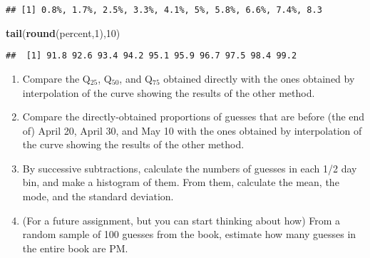 \documentclass[]{book}
\newenvironment{Shaded}{\begin{snugshade}}{\end{snugshade}}
\newcommand{\DataTypeTok}[1]{\textcolor[rgb]{0.13,0.29,0.53}{#1}}
\newcommand{\DecValTok}[1]{\textcolor[rgb]{0.00,0.00,0.81}{#1}}
\newcommand{\KeywordTok}[1]{\textcolor[rgb]{0.13,0.29,0.53}{\textbf{#1}}}
\newcommand{\NormalTok}[1]{#1}
\newcommand{\OperatorTok}[1]{\textcolor[rgb]{0.81,0.36,0.00}{\textbf{#1}}}
\newcommand{\StringTok}[1]{\textcolor[rgb]{0.31,0.60,0.02}{#1}}
\begin{document}
\begin{Shaded}
\end{Shaded}

\begin{verbatim}
## [1] 0.8%, 1.7%, 2.5%, 3.3%, 4.1%, 5%, 5.8%, 6.6%, 7.4%, 8.3
\end{verbatim}

\begin{Shaded}
\begin{Highlighting}[]
\KeywordTok{tail}\NormalTok{(}\KeywordTok{round}\NormalTok{(percent,}\DecValTok{1}\NormalTok{),}\DecValTok{10}\NormalTok{)}
\end{Highlighting}
\end{Shaded}

\begin{verbatim}
##  [1] 91.8 92.6 93.4 94.2 95.1 95.9 96.7 97.5 98.4 99.2
\end{verbatim}

\begin{enumerate}
\def\labelenumi{\arabic{enumi}.}
\setcounter{enumi}{2}
\item
  Compare the Q\(_{25}\), Q\(_{50}\), and Q\(_{75}\) obtained directly with the ones obtained by interpolation of the curve showing the results of the other method.
\item
  Compare the directly-obtained proportions of guesses that are before (the end of) April 20, April 30, and May 10 with the ones obtained by interpolation of the curve showing the results of the other method.
\item
  By successive subtractions, calculate the numbers of guesses in each 1/2 day bin, and make a histogram of them. From them, calculate the mean, the mode, and the standard deviation.
\item
  (For a future assignment, but you can start thinking about how) From a random sample of 100 guesses from the book, estimate how many guesses in the entire book are PM.
\end{enumerate}
\end{document}

